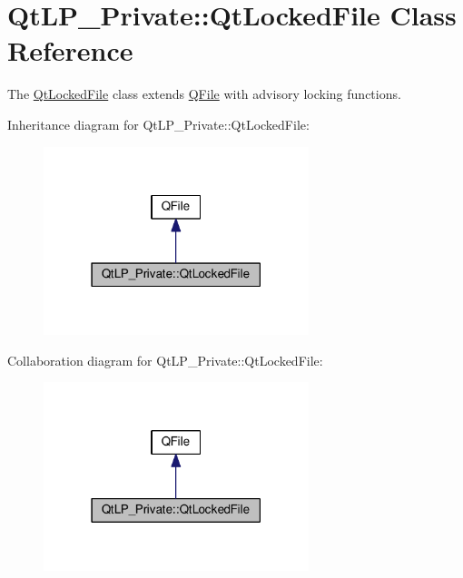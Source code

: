 \hypertarget{class_qt_l_p___private_1_1_qt_locked_file}{}\section{Qt\+L\+P\+\_\+\+Private\+:\+:Qt\+Locked\+File Class Reference}
\label{class_qt_l_p___private_1_1_qt_locked_file}


The \hyperlink{class_qt_l_p___private_1_1_qt_locked_file}{Qt\+Locked\+File} class extends \hyperlink{class_q_file}{Q\+File} with advisory locking functions.  




Inheritance diagram for Qt\+L\+P\+\_\+\+Private\+:\+:Qt\+Locked\+File\+:\nopagebreak
\begin{figure}[H]
\begin{center}
\leavevmode
\includegraphics[width=219pt]{class_qt_l_p___private_1_1_qt_locked_file__inherit__graph}
\end{center}
\end{figure}


Collaboration diagram for Qt\+L\+P\+\_\+\+Private\+:\+:Qt\+Locked\+File\+:\nopagebreak
\begin{figure}[H]
\begin{center}
\leavevmode
\includegraphics[width=219pt]{class_qt_l_p___private_1_1_qt_locked_file__coll__graph}
\end{center}
\end{figure}
